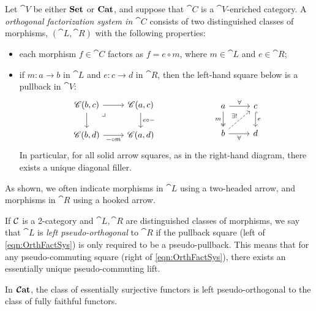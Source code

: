 \documentclass[12pt,oneside,article,draft]{memoir}
\begin{document}
\begin{definition}\label{def:orthogonal}
Let $\cat{V}$ be either $\mathbf{Set}$ or $\mathbf{Cat}$, and suppose that $\cat{C}$ is a $\cat{V}$-enriched category. A \emph{orthogonal factorization system in $\cat{C}$} consists of two distinguished classes of morphisms, $(\cat{L},\cat{R})$ with the following properties:
\begin{itemize}
\item each morphism $f\in\cat{C}$ factors as $f=e\circ m$, where $m\in\cat{L}$ and $e\in\cat{R}$;
\item if $m\colon a\to b$ in $\cat{L}$ and $e\colon c\to d$ in $\cat{R}$, then the left-hand square below is a pullback in $\cat{V}$:
\begin{equation}\label{eqn:OrthFactSys}
\begin{tikzcd}
\cat{C}(b,c)\ar[r]\ar[d]\ar[rd,phantom,"\lrcorner" very near start]&\cat{C}(a,c)\ar[d,"e\circ -"]\\
\cat{C}(b,d)\ar[r,"-\circ m"']&\cat{C}(a,d)
\end{tikzcd}
\hspace{.9in}
\begin{tikzcd}
a\ar[r,"\forall"]\ar[d,two heads,"m"']&c\ar[d,hook, "e"]\\
b\ar[r,"\forall"']\ar[ur,dashed,"\exists!"]&d
\end{tikzcd}
\end{equation}
In particular, for all solid arrow squares, as in the right-hand diagram, there exists a unique diagonal filler. 
\end{itemize}
As shown, we often indicate morphisms in $\cat{L}$ using a two-headed arrow, and morphisms in $\cat{R}$ using a hooked arrow.
\end{definition}

If $\mathcal{C}$ is a 2-category and $\cat{L}, \cat{R}$ are distinguished classes of morphisms, we say that $\cat{L}$ is \emph{left pseudo-orthogonal} to $\cat{R}$ if the pullback square (left of \eqref{eqn:OrthFactSys}) is only required to be a pseudo-pullback. This means that for any pseudo-commuting square (right of \eqref{eqn:OrthFactSys}), there exists an essentially unique pseudo-commuting lift.

\begin{example}\label{ex:ess_surj_pseudo_ff}
In $\bm{\mathcal{C}}\mathbf{at}$, the class of essentially surjective functors is left pseudo-orthogonal to the class of fully faithful functors.
\end{example}
\end{document}
